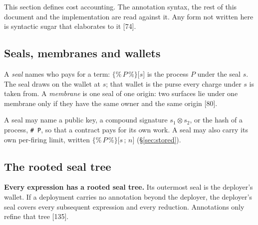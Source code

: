 \documentclass[10.5pt]{article}
\newcommand{\ob}{\texttt{\{\%}}
\newcommand{\cb}{\texttt{\%\}}}
\newcommand{\sealed}[2]{\ensuremath{\ob\,#1\,\cb\texttt{[}#2\texttt{]}}}
\newcommand{\code}[1]{\texttt{#1}}
\newcommand{\D}[1]{{\color{muted}\small[#1]}}
\begin{document}
This section defines cost accounting. The annotation syntax, the rest of this document and the implementation are read against it. Any form not written here is syntactic sugar that elaborates to it \D{74}.

\subsection{Seals, membranes and wallets}

A \emph{seal} names who pays for a term: \sealed{P}{s} is the process $P$ under the seal $s$. The seal draws on the wallet at $s$; that wallet is the purse every charge under $s$ is taken from. A \emph{membrane} is one seal of one origin: two surfaces lie under one membrane only if they have the same owner and the same origin \D{80}.

A seal may name a public key, a compound signature $s_1 \otimes s_2$, or the hash of a process, \code{\# P}, so that a contract pays for its own work. A seal may also carry its own per-firing limit, written \sealed{P}{s\,;\,n} (\S\ref{sec:stored}).

\subsection{The rooted seal tree}\label{sec:tree}

\begin{keypoint}
\textbf{Every expression has a rooted seal tree.} Its outermost seal is the deployer's wallet. If a deployment carries no annotation beyond the deployer, the deployer's seal covers every subsequent expression and every reduction. Annotations only refine that tree \D{135}.
\end{keypoint}
\end{document}
